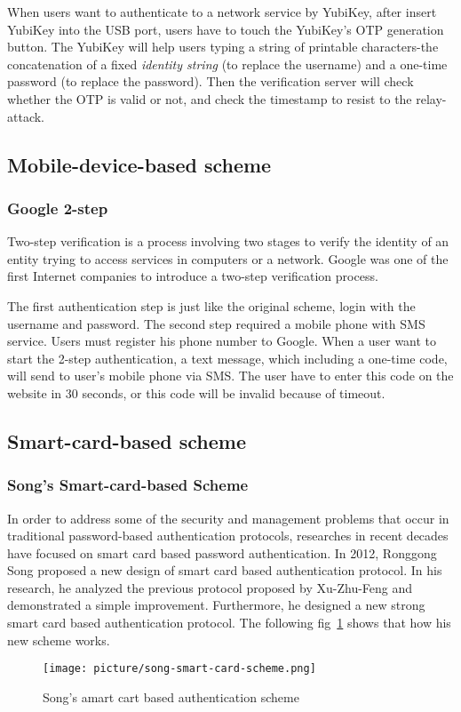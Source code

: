 \begin{CJK}{Bg5}{bsmi}
When users want to authenticate to a network service by YubiKey, after insert YubiKey into the USB port, users have to touch the YubiKey's OTP generation button. The YubiKey will help users typing a string of printable characters-the concatenation of a fixed \emph{identity string} (to replace the username) and a one-time password (to replace the password). Then the verification server will check whether the OTP is valid or not, and check the timestamp to resist to the relay-attack.

\subsection{Mobile-device-based scheme}

\subsubsection{Google 2-step}

Two-step verification is a process involving two stages to verify the identity of an entity trying to access services in computers or a network. Google was one of the first Internet companies to introduce a two-step verification process\cite{google-2-step}. 

The first authentication step is just like the original scheme, login with the username and password. The second step required a mobile phone with SMS service. Users must register his phone number to Google. When a user want to start the 2-step authentication, a text message, which including a one-time code, will send to user's mobile phone via SMS. The user have to enter this code on the website in 30 seconds, or this code will be invalid because of timeout.

\subsection{Smart-card-based scheme}

\subsubsection{Song's Smart-card-based Scheme}

In order to address some of the security and management problems that occur in traditional password-based authentication protocols, researches in recent decades have focused on smart card based password authentication. In 2012, Ronggong Song proposed a new design of smart card based authentication protocol\cite{smart-card}. In his research, he analyzed the previous protocol proposed by Xu-Zhu-Feng and demonstrated a simple improvement. Furthermore, he designed a new strong smart card based authentication protocol. The following fig~\ref{fig:song-smard-card-scheme} shows that how his new scheme works.

\begin{figure}
\centering
\texttt{[image: picture/song-smart-card-scheme.png]}
\caption{Song's amart cart based authentication scheme}
\label{fig:song-smard-card-scheme}
\end{figure}
\end{CJK}